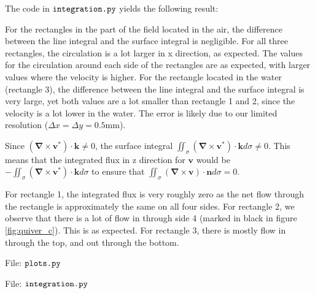 \documentclass[a4paper,10pt,english]{article}
\begin{document}
\newpage
The code in $\verb|integration.py|$ yields the following result:


For the rectangles in the part of the field located in the air, the difference between the line integral and the surface integral is negligible. For all three rectangles, the circulation is a lot larger in x direction, as expected. The values for the circulation around each side of the rectangles are as expected, with larger values where the velocity is higher. For the rectangle located in the water (rectangle 3), the difference between the line integral and the surface integral is very large, yet both values are a lot smaller than rectangle 1 and 2, since the velocity is a lot lower in the water. The error is likely due to our limited resolution ($\Delta x = \Delta y = 0.5$mm).

Since $(\bm{\nabla}\times\bm{v}^*)\cdot\bm{k} \neq 0$, the surface integral $\iint_{\sigma} (\bm{\nabla}\times\bm{v}^*)\cdot\bm{k} d\sigma \neq 0$. This means that the integrated flux in z direction for $\bm{v}$ would be $-\iint_{\sigma} (\bm{\nabla}\times\bm{v}^*)\cdot\bm{k} d\sigma$ to ensure that $\iint_{\sigma} (\bm{\nabla}\times\bm{v})\cdot\bm{n} d\sigma = 0$.

For rectangle 1, the integrated flux is very roughly zero as the net flow through the rectangle is approximately the same on all four sides. For rectangle 2, we observe that there is a lot of flow in through side 4 (marked in black in figure \ref{fig:quiver_c}). This is as expected. For rectangle 3, there is mostly flow in through the top, and out through the bottom.

\newpage
File: $\verb|plots.py|$


File: $\verb|integration.py|$

\end{document}
